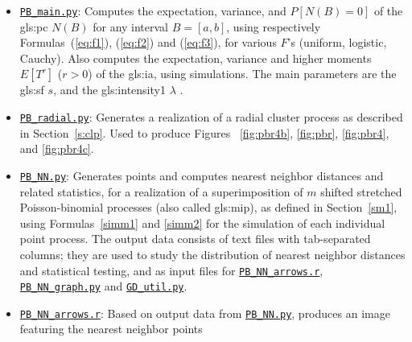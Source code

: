 \documentclass[10pt]{article}
\begin{document}
\begin{itemize}
\item \href{https://github.com/VincentGranville/Point-Processes/blob/main/Source\%20Code/PB_main.py}{\texttt{PB\_main.py}}: Computes the expectation, variance, and $P[N(B)=0]$ of  the \gls{gls:pc} $N(B)$ for any interval $B=[a,b]$,
using respectively Formulas~(\ref{eq:f1}), (\ref{eq:f2}) and (\ref{eq:f3}), for various $F$'s (uniform, logistic, Cauchy). Also computes the expectation, variance and higher moments $E[T^r]$ ($r>0$) of the \gls{gls:ia}, using simulations.
The main parameters are the \gls{gls:sf} $s$, and the \gls{gls:intensity1} $\lambda$ .
\item \href{https://github.com/VincentGranville/Point-Processes/blob/main/Source\%20Code/PB_radial.py}{\texttt{PB\_radial.py}}: Generates a realization of a radial cluster process as described in Section~\ref{s:clp}. Used to produce
Figures~ \ref{fig:pbr4b}, \ref{fig:pbr}, \ref{fig:pbr4}, and \ref{fig:pbr4c}.
\item \href{https://github.com/VincentGranville/Point-Processes/blob/main/Source\%20Code/PB_NN.py}{\texttt{PB\_NN.py}}: Generates points and computes \textcolor{index}{nearest neighbor distances} and related statistics, for a realization of a superimposition
of $m$ shifted stretched Poisson-binomial processes (also called \gls{gls:mip}), as defined in Section~\ref{sm1}, using Formulas~\ref{simm1} and
\ref{simm2} for the simulation of each individual point process. The output data consists of text files with tab-separated columns; they are used to study the distribution of nearest neighbor distances and statistical testing,
and as input files for
    \href{https://github.com/VincentGranville/Point-Processes/blob/main/Source\%20Code/PP_NN_arrows.r}{\texttt{PB\_NN\_arrows.r}},
    \href{https://github.com/VincentGranville/Point-Processes/blob/main/Source\%20Code/PB_NN_graph.py}{\texttt{PB\_NN\_graph.py}} and
    \href{https://github.com/VincentGranville/Point-Processes/blob/main/Source\%20Code/GD_util.py}{\texttt{GD\_util.py}}.
\item \href{https://github.com/VincentGranville/Point-Processes/blob/main/Source\%20Code/PP_NN_arrows.r}{\texttt{PB\_NN\_arrows.r}}: Based on output data from
       \href{https://github.com/VincentGranville/Point-Processes/blob/main/Source\%20Code/PB_NN.py}{\texttt{PB\_NN.py}}, produces an image featuring the nearest neighbor points

\end{itemize}
\end{document}
